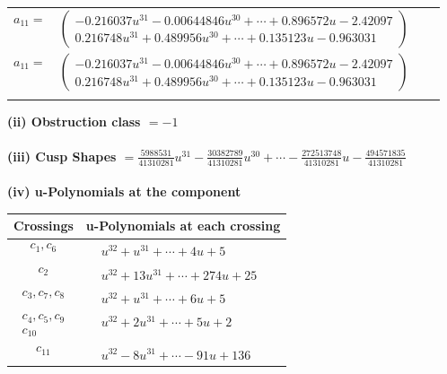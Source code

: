 \documentclass[1p]{elsarticle_modified}
\theoremstyle{definition}
\begin{document}
\begin{tabular}{m{7pt} m{180pt} m{7pt} m{180pt} }
\flushright $a_{11}=$&$\begin{pmatrix}-0.216037 u^{31}-0.00644846 u^{30}+\cdots+0.896572 u-2.42097\\0.216748 u^{31}+0.489956 u^{30}+\cdots+0.135123 u-0.963031\end{pmatrix}$\\ \flushright $a_{11}=$&$\begin{pmatrix}-0.216037 u^{31}-0.00644846 u^{30}+\cdots+0.896572 u-2.42097\\0.216748 u^{31}+0.489956 u^{30}+\cdots+0.135123 u-0.963031\end{pmatrix}$\\&\end{tabular}
\flushleft \textbf{(ii) Obstruction class $= -1$}\\~\\
\flushleft \textbf{(iii) Cusp Shapes $= \frac{5988531}{41310281} u^{31}-\frac{30382789}{41310281} u^{30}+\cdots-\frac{272513748}{41310281} u-\frac{494571835}{41310281}$}\\~\\
\newpage\renewcommand{\arraystretch}{1}
\flushleft \textbf{(iv) u-Polynomials at the component}\newline \\
\begin{tabular}{m{50pt}|m{274pt}}
Crossings & \hspace{64pt}u-Polynomials at each crossing \\
\hline $$\begin{aligned}c_{1},c_{6}\end{aligned}$$&$\begin{aligned}
&u^{32}+u^{31}+\cdots+4 u+5
\end{aligned}$\\
\hline $$\begin{aligned}c_{2}\end{aligned}$$&$\begin{aligned}
&u^{32}+13 u^{31}+\cdots+274 u+25
\end{aligned}$\\
\hline $$\begin{aligned}c_{3},c_{7},c_{8}\end{aligned}$$&$\begin{aligned}
&u^{32}+u^{31}+\cdots+6 u+5
\end{aligned}$\\
\hline $$\begin{aligned}c_{4},c_{5},c_{9}\\c_{10}\end{aligned}$$&$\begin{aligned}
&u^{32}+2 u^{31}+\cdots+5 u+2
\end{aligned}$\\
\hline $$\begin{aligned}c_{11}\end{aligned}$$&$\begin{aligned}
&u^{32}-8 u^{31}+\cdots-91 u+136
\end{aligned}$\\
\hline
\end{tabular}\\~\\
\end{document}
